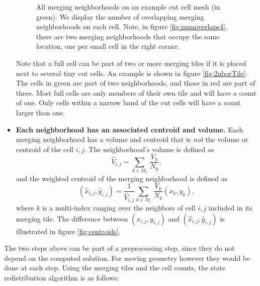 \begin{itemize}
\begin{figure}
	\caption{\sf All merging neighborhoods on an example cut cell mesh (in green).  We display the number of overlapping merging neighborhoods on each cell. Note, in figure \ref{fig:numoverlaps4}, there are two merging neighborhoods that occupy the same location, one per small cell in the right corner.} \label{fig:overlappingneighs}
\end{figure}
Note that a full cell
can be part of two or more merging tiles if it is placed next to 
several tiny cut cells. An example is shown in
figure \ref{fig:2nborTile}. The cells in green are part of two
neighborhoods, and those in red are part of three.   
 Most full
cells are only members of their own tile and will have a count of one.
Only cells within a narrow band of the cut cells will have a count
larger than one.

\item
{\bf Each neighborhood has an associated centroid and volume.}
Each merging neighborhood has a volume and centroid that is \textit{not} the volume or centroid of the cell $i,j$.  The neighborhood's volume is defined as
\begin{equation}
\label{voldef}
{\widehat V}_{i,j} =  \sum_{k \in M_i } \,  \frac{V_k}{N_k},
\end{equation}
and the weighted centroid of the merging neighborhood is defined as
\begin{equation}
\label{centroiddef}
({\widehat x}_{i,j},{\widehat y}_{i,j}) = \frac{1}{\widehat V_{i,j}} \sum_{k \in M_i } \,  \frac{V_k}{N_k}(x_k,y_k),
\end{equation}
where $k$ is a multi-index ranging over the neighbors of cell $i,j$ included in its merging tile.  The difference between $(x_{i,j}, y_{i,j})$ and $(\widehat{x}_{i,j}, \widehat{y}_{i,j})$ is illustrated in figure \ref{fig:centroids}.

\end{itemize}



The two steps above can be part of a preprocessing step, since they do not
depend on the computed solution. For moving geometry however they would
be done at each step.
Using the merging tiles and the cell counts, the state redistribution
algorithm is as follows:

